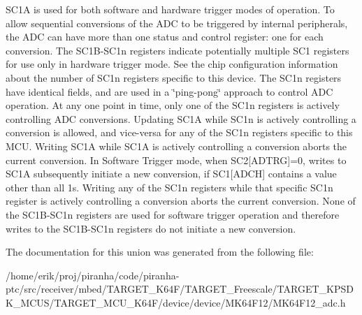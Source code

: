 S\+C1A is used for both software and hardware trigger modes of operation. To allow sequential conversions of the A\+DC to be triggered by internal peripherals, the A\+DC can have more than one status and control register\+: one for each conversion. The S\+C1\+B-\/\+S\+C1n registers indicate potentially multiple S\+C1 registers for use only in hardware trigger mode. See the chip configuration information about the number of S\+C1n registers specific to this device. The S\+C1n registers have identical fields, and are used in a \char`\"{}ping-\/pong\char`\"{} approach to control A\+DC operation. At any one point in time, only one of the S\+C1n registers is actively controlling A\+DC conversions. Updating S\+C1A while S\+C1n is actively controlling a conversion is allowed, and vice-\/versa for any of the S\+C1n registers specific to this M\+CU. Writing S\+C1A while S\+C1A is actively controlling a conversion aborts the current conversion. In Software Trigger mode, when S\+C2\mbox{[}A\+D\+T\+RG\mbox{]}=0, writes to S\+C1A subsequently initiate a new conversion, if S\+C1\mbox{[}A\+D\+CH\mbox{]} contains a value other than all 1s. Writing any of the S\+C1n registers while that specific S\+C1n register is actively controlling a conversion aborts the current conversion. None of the S\+C1\+B-\/\+S\+C1n registers are used for software trigger operation and therefore writes to the S\+C1\+B-\/\+S\+C1n registers do not initiate a new conversion. 

The documentation for this union was generated from the following file\+:\begin{DoxyCompactItemize}
\item 
/home/erik/proj/piranha/code/piranha-\/ptc/src/receiver/mbed/\+T\+A\+R\+G\+E\+T\+\_\+\+K64\+F/\+T\+A\+R\+G\+E\+T\+\_\+\+Freescale/\+T\+A\+R\+G\+E\+T\+\_\+\+K\+P\+S\+D\+K\+\_\+\+M\+C\+U\+S/\+T\+A\+R\+G\+E\+T\+\_\+\+M\+C\+U\+\_\+\+K64\+F/device/device/\+M\+K64\+F12/M\+K64\+F12\+\_\+adc.\+h\end{DoxyCompactItemize}
